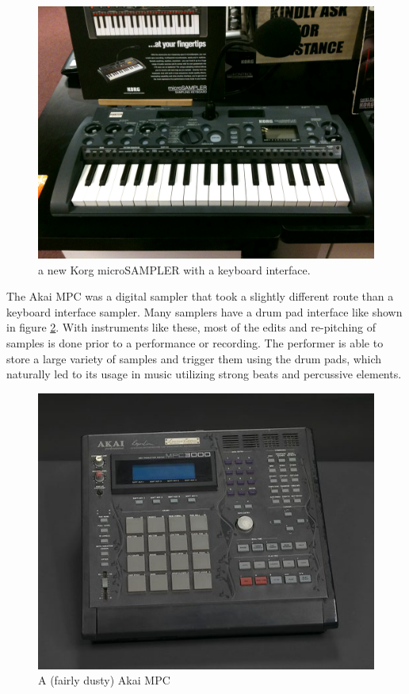 \begin{figure}
    \centering
    \includegraphics[scale=0.2]{diagrams/Korg_microSAMPLER.jpg}
    \caption{a new Korg microSAMPLER with a keyboard interface.}
    \label{fig:microSampler}
\end{figure}

The Akai MPC was a digital sampler that took a slightly different route than a keyboard interface sampler. Many samplers have a drum pad interface like shown in figure \ref{fig:mpc}. With instruments like these, most of the edits and re-pitching of samples is done prior to a performance or recording. The performer is able to store a large variety of samples and trigger them using the drum pads, which naturally led to its usage in music utilizing strong beats and percussive elements. 

\begin{figure}
    \centering
    \includegraphics[scale=0.6]{diagrams/YSH000914_MIDI-Production-Center-3000-Limited-Edition-used-by-J-Dilla.jpg}
    \caption{A (fairly dusty) Akai MPC}
    \label{fig:mpc}
\end{figure}

